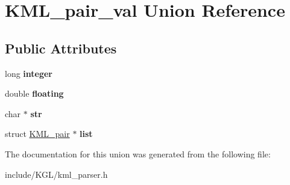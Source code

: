 \hypertarget{union_k_m_l__pair__val}{}\section{K\+M\+L\+\_\+pair\+\_\+val Union Reference}
\label{union_k_m_l__pair__val}
\subsection*{Public Attributes}
\begin{DoxyCompactItemize}
\item 
\mbox{\label{union_k_m_l__pair__val_a58aa8a2b801c691684862a7dd3e9602f}} 
long {\bfseries integer}
\item 
\mbox{\label{union_k_m_l__pair__val_a52ac1ab27286edc2c22fbfc9451e0b62}} 
double {\bfseries floating}
\item 
\mbox{\label{union_k_m_l__pair__val_aa02fd515d1d1b90769106ff9a7d916ea}} 
char $\ast$ {\bfseries str}
\item 
\mbox{\label{union_k_m_l__pair__val_a333cf127a3856c7107b5c78b287ca81f}} 
struct \mbox{\hyperlink{struct_k_m_l__pair}{K\+M\+L\+\_\+pair}} $\ast$ {\bfseries list}
\end{DoxyCompactItemize}


The documentation for this union was generated from the following file\+:\begin{DoxyCompactItemize}
\item 
include/\+K\+G\+L/kml\+\_\+parser.\+h\end{DoxyCompactItemize}
